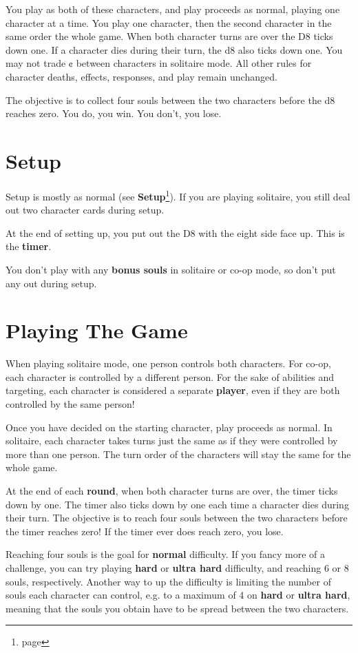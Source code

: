 \documentclass[a4paper, twoside]{report} %
\begin{document}
    You play as both of these characters, and play proceeds as normal, playing one character at a time. You play one character, then the second character in the same order the whole game. When both character turns are over the D8 ticks down one. If a character dies during their turn, the d8 also ticks down one. You may not trade ¢ between characters in solitaire mode. All other rules for character deaths, effects, responses, and play remain unchanged.

    The objective is to collect four souls between the two characters before the d8 reaches zero. You do, you win. You don’t, you lose.
    \section{Setup}
    Setup is mostly as normal (see \textbf{Setup}\footnote{page \pageref{setup}}). If you are playing solitaire, you still deal out two character cards during setup.

    At the end of setting up, you put out the D8 with the eight side face up. This is the \textbf{timer}.

    You don’t play with any \textbf{bonus souls} in solitaire or co-op mode, so don’t put any out during setup.
    \section{Playing The Game}
    When playing solitaire mode, one person controls both characters. For co-op, each character is controlled by a different person. For the sake of abilities and targeting, each character is considered a separate \textbf{player}, even if they are both controlled by the same person!

    Once you have decided on the starting character, play proceeds as normal. In solitaire, each character takes turns just the same as if they were controlled by more than one person. The turn order of the characters will stay the same for the whole game.

    At the end of each \textbf{round}, when both character turns are over, the timer ticks down by one. The timer also ticks down by one each time a character dies during their turn. The objective is to reach four souls between the two characters before the timer reaches zero! If the timer ever does reach zero, you lose.

    Reaching four souls is the goal for \textbf{normal} difficulty. If you fancy more of a challenge, you can try playing \textbf{hard} or \textbf{ultra hard} difficulty, and reaching 6 or 8 souls, respectively. Another way to up the difficulty is limiting the number of souls each character can control, e.g. to a maximum of 4 on \textbf{hard} or \textbf{ultra hard}, meaning that the souls you obtain have to be spread between the two characters.
\end{document}
